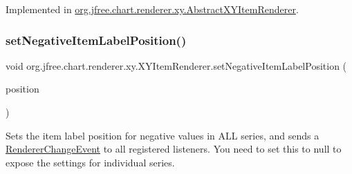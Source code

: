 Implemented in \mbox{\hyperlink{classorg_1_1jfree_1_1chart_1_1renderer_1_1xy_1_1_abstract_x_y_item_renderer_a97f408b8a3a32497f042a33ae4da36a2}{org.\+jfree.\+chart.\+renderer.\+xy.\+Abstract\+X\+Y\+Item\+Renderer}}.

\mbox{\label{interfaceorg_1_1jfree_1_1chart_1_1renderer_1_1xy_1_1_x_y_item_renderer_a68062ba8cb6465b1219f72ecc17a3c3b}} 
\subsubsection{\texorpdfstring{set\+Negative\+Item\+Label\+Position()}{setNegativeItemLabelPosition()}\hspace{0.1cm}{\footnotesize\ttfamily [1/2]}}
{\footnotesize\ttfamily void org.\+jfree.\+chart.\+renderer.\+xy.\+X\+Y\+Item\+Renderer.\+set\+Negative\+Item\+Label\+Position (\begin{DoxyParamCaption}\item[{\mbox{\hyperlink{classorg_1_1jfree_1_1chart_1_1labels_1_1_item_label_position}{Item\+Label\+Position}}}]{position }\end{DoxyParamCaption})}

Sets the item label position for negative values in A\+LL series, and sends a \mbox{\hyperlink{}{Renderer\+Change\+Event}} to all registered listeners. You need to set this to {\ttfamily null} to expose the settings for individual series.


